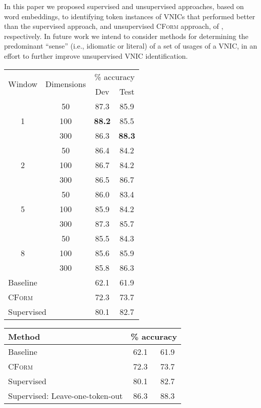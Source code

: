 \documentclass[11pt]{article}
\newcommand{\cform}{\textsc{CForm}\xspace}
\newcommand{\VNIC}{VNIC\xspace}
\newcommand{\VNICs}{VNICs\xspace}
\begin{document}
In this paper we proposed supervised and unsupervised approaches,
based on word embeddings, to identifying token instances of \VNICs
that performed better than the supervised approach, and unsupervised
\cform approach, of \cite{Fazly2009}, respectively. In future work we
intend to consider methods for determining the predominant ``sense''
(i.e., idiomatic or literal) of a set of usages of a \VNIC, in an
effort to further improve unsupervised \VNIC identification.


\begin{table*}
\centering
\begin{tabular}{cccc} \hline
\multirow{2}{*}{Window} & \multirow{2}{*}{Dimensions} & \multicolumn{2}{c}{\% accuracy} \\
& & Dev & Test \\ 
\hline
  & 50  & 87.3 & 85.9  \\
1 & 100 & \textbf{88.2} & 85.5  \\ 
  & 300 & 86.3 & \textbf{88.3}  \\ 
\hline
  & 50  & 86.4 & 84.2  \\
2 & 100 & 86.7 & 84.2   \\ 
  & 300 & 86.5 & 86.7  \\ 
\hline
  & 50  & 86.0 & 83.4  \\
5 & 100 & 85.9 & 84.2  \\ 
  & 300 & 87.3 & 85.7  \\ 
\hline
  & 50  & 85.5 & 84.3  \\
8 & 100 & 85.6 & 85.9  \\ 
  & 300 & 85.8 & 86.3   \\ 
\hline
\multicolumn{2}{l}{Baseline} & 62.1 & 61.9\\
\multicolumn{2}{l}{\cite{Fazly2009} \cform} & 72.3 & 73.7\\
\multicolumn{2}{l}{\cite{Fazly2009} Supervised} & 80.1 & 82.7 \\
\hline
\end{tabular}
\end{table*}


\begin{table*}
\centering
\begin{tabular}{lcc}
\hline
Method & \multicolumn{2}{c}{\% accuracy} \\
\hline
Baseline & 62.1 & 61.9\\
\cite{Fazly2009} \cform & 72.3 & 73.7\\
\cite{Fazly2009} Supervised & 80.1 & 82.7 \\
Supervised: Leave-one-token-out & 86.3 & 88.3\\
\hline
\end{tabular}
\end{table*}
\end{document}
